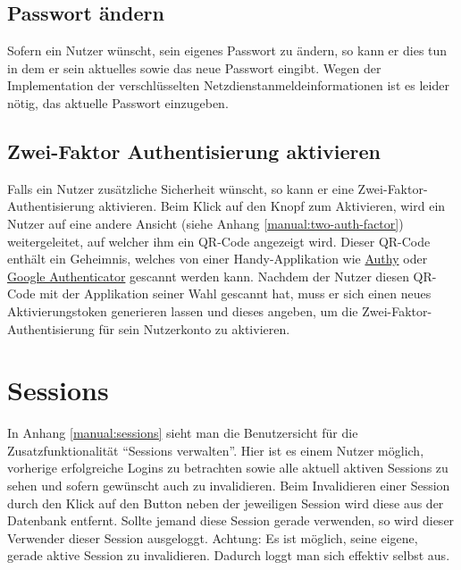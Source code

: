 \documentclass[12pt,DIV14,BCOR10mm,a4paper,parskip=half-,headsepline,headinclude,english,ngerman,bibliography=totocnumbered]{scrreprt}
\begin{document}
\subsection{Passwort ändern}

Sofern ein Nutzer wünscht, sein eigenes Passwort zu ändern, so kann er dies tun in dem er sein aktuelles sowie das neue Passwort eingibt.
Wegen der Implementation der verschlüsselten Netzdienstanmeldeinformationen ist es leider nötig, das aktuelle Passwort einzugeben.

\subsection{Zwei-Faktor Authentisierung aktivieren}

Falls ein Nutzer zusätzliche Sicherheit wünscht, so kann er eine Zwei-Faktor-Authentisier\-ung aktivieren.
Beim Klick auf den Knopf zum Aktivieren, wird ein Nutzer auf eine andere Ansicht (siehe Anhang \ref{manual:two-auth-factor}) weitergeleitet, auf welcher ihm ein QR-Code angezeigt wird.
Dieser QR-Code enthält ein Geheimnis, welches von einer Handy-Applikation wie \href{https://authy.com/}{Authy}
 oder \href{https://play.google.com/store/apps/details?id=com.google.android.apps.authenticator2\&hl=en}{Google Authenticator} gescannt werden kann.
Nachdem der Nutzer diesen QR-Code mit der Applikation seiner Wahl gescannt hat, muss er sich einen neues Aktivierungstoken generieren lassen und dieses angeben, um die Zwei-Faktor-Authentisierung für sein Nutzerkonto zu aktivieren.

\section{Sessions}

In Anhang \autoref{manual:sessions} sieht man die Benutzersicht für die Zusatzfunktionalität \enquote{Sessions verwalten}.
Hier ist es einem Nutzer möglich, vorherige erfolgreiche Logins zu betrachten sowie alle aktuell aktiven Sessions zu sehen und sofern gewünscht auch zu invalidieren.
Beim Invalidieren einer Session durch den Klick auf den Button neben der jeweiligen Session wird diese aus der Datenbank entfernt.
Sollte jemand diese Session gerade verwenden, so wird dieser Verwender dieser Session ausgeloggt.
Achtung: Es ist möglich, seine eigene, gerade aktive Session zu invalidieren.
Dadurch loggt man sich effektiv selbst aus.

\printbibliography

\printacronyms[title=Abkürzungsverzeichnis,toctitle=Abkürzungsverzeichnis]
\printglossary[title=Glossar,toctitle=Glossar,type=main]
\end{document}
